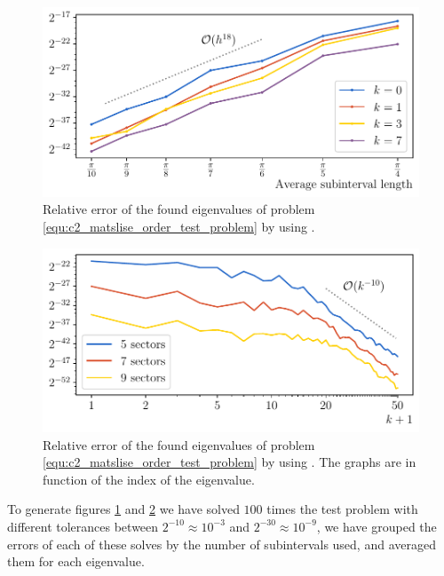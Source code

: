 \begin{figure}
    \begin{center}
        \includegraphics[width=\textwidth]{img/chapter2/matslise_h_error.pdf}
    \end{center}
    \caption{Relative error of the found eigenvalues of problem \eqref{equ:c2_matslise_order_test_problem} by using .}
    \label{fig:c2_matslise_h_error}
\end{figure}

\begin{figure}
    \begin{center}
        \includegraphics[width=\textwidth]{img/chapter2/matslise_k_error.pdf}
    \end{center}
    \caption{Relative error of the found eigenvalues of problem \eqref{equ:c2_matslise_order_test_problem} by using . The graphs are in function of the index of the eigenvalue.}
    \label{fig:c2_matslise_k_error}
\end{figure}

To generate figures \ref{fig:c2_matslise_h_error} and \ref{fig:c2_matslise_k_error} we have solved $100$ times the test problem with different tolerances between $2^{-10} \approx 10^{-3}$ and $2^{-30} \approx 10^{-9}$, we have grouped the errors of each of these solves by the number of subintervals  used, and averaged them for each eigenvalue.

